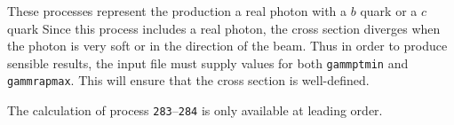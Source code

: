 \label{subsec:heavyfl}

These processes represent the production a real photon with a $b$
quark or a $c$ quark Since this process includes a real photon, the
cross section diverges when the photon is very soft or in the
direction of the beam.  Thus in order to produce sensible results, the
input file must supply values for both {\tt gammptmin} and {\tt
gammrapmax}. This will ensure that the cross section is
well-defined.

The calculation of process {\tt 283}--{\tt 284} is only available at leading order.
